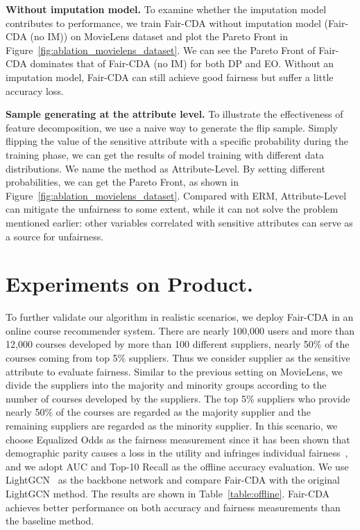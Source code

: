 \documentclass[letterpaper]{article} %
\begin{document}
\noindent\textbf{Without imputation model.} To examine whether the imputation model contributes to performance, we train Fair-CDA without imputation model (Fair-CDA (no IM)) on MovieLens dataset and plot the Pareto Front in Figure~\ref{fig:ablation_movielens_dataset}. We can see the Pareto Front of Fair-CDA dominates that of Fair-CDA (no IM) for both DP and EO. Without an imputation model, Fair-CDA can still achieve good fairness but suffer a little accuracy loss. 

\noindent\textbf{Sample generating at the attribute level.} To illustrate the effectiveness of feature decomposition, we use a naive way to generate the flip sample. Simply flipping the value of the sensitive attribute with a specific probability during the training phase, we can get the results of model training with different data distributions. We name the method as Attribute-Level. By setting different probabilities, we can get the Pareto Front, as shown in Figure~\ref{fig:ablation_movielens_dataset}. Compared with ERM, Attribute-Level can mitigate the unfairness to some extent, while it can not solve the problem mentioned earlier: other variables correlated with sensitive attributes can serve as a source for unfairness.

\section{Experiments on Product.}

To further validate our algorithm in realistic scenarios, we deploy Fair-CDA in an online course recommender system. There are nearly 100,000 users and more than 12,000 courses developed by more than 100 different suppliers, nearly 50\% of the courses coming from top 5\% suppliers. Thus we consider supplier as the sensitive attribute to evaluate fairness. Similar to the previous setting on MovieLens, we divide the suppliers into the majority and minority groups according to the number of courses developed by the suppliers. The top 5\% suppliers who provide nearly 50\% of the courses are regarded as the majority supplier and the remaining suppliers are regarded as the minority supplier. In this scenario, we choose Equalized Odds as the fairness measurement since it has been shown that demographic parity causes a loss in the utility and infringes individual fairness~\cite{singh2018fairness}, and we adopt AUC and Top-10 Recall as the offline accuracy 
evaluation. We use LightGCN~\cite{LightGCN2020} as the backbone network and compare Fair-CDA with the original LightGCN method. The results are shown in Table~\ref{table:offline}. Fair-CDA achieves better performance on both accuracy and fairness measurements than the baseline method.
\end{document}
